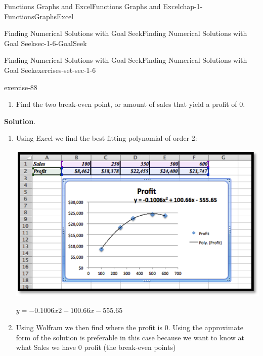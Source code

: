 \documentclass[oneside,10pt,]{book}
\numberwithin{equation}{section}
\begin{document}
\begin{chapterptx}{Functions Graphs and Excel}{}{Functions Graphs and Excel}{}{}{chap-1-FunctionsGraphsExcel}
\begin{sectionptx}{Finding Numerical Solutions with Goal Seek}{}{Finding Numerical Solutions with Goal Seek}{}{}{sec-1-6-GoalSeek}
\begin{exercises-subsection-numberless}{Finding Numerical Solutions with Goal Seek}{}{Finding Numerical Solutions with Goal Seek}{}{}{exercises-set-sec-1-6}
\begin{divisionexercise}{13}{}{}{exercise-88}
\begin{enumerate}[label=(\alph*)]
Find the best fitting curve for the data.%
\item\hypertarget{li-146}{}\hypertarget{p-527}{}%
Find the two break-even point, or amount of sales that yield a profit of \textdollar{}0.%
\end{enumerate}
\par\smallskip%
\noindent\textbf{Solution}.\hypertarget{solution-42}{}\quad%
\leavevmode%
\begin{enumerate}[label=(\alph*)]
\item\hypertarget{li-147}{}\hypertarget{p-528}{}%
Using Excel we find the best fitting polynomial of order 2: \leavevmode%
\begin{sidebyside}{1}{0.2}{0.2}{0}%
\begin{sbspanel}{0.6}%
\includegraphics[width=1\linewidth]{images/sec1-6-sol13a.png}
\end{sbspanel}%
\end{sidebyside}%
 \(y = -0.1006x2 + 100.66x - 555.65\)%
\item\hypertarget{li-148}{}\hypertarget{p-529}{}%
Using Wolfram we then find where the profit is 0. Using the approximate form of the solution is preferable in this case because we want to know at what Sales we have 0 profit (the break-even points) \leavevmode%
\begin{sidebyside}{1}{0.2}{0.2}{0}%
\begin{sbspanel}{0.6}%

\end{sbspanel}
\end{sidebyside}
\end{enumerate}
\end{divisionexercise}
\end{exercises-subsection-numberless}
\end{sectionptx}
\end{chapterptx}
\end{document}
